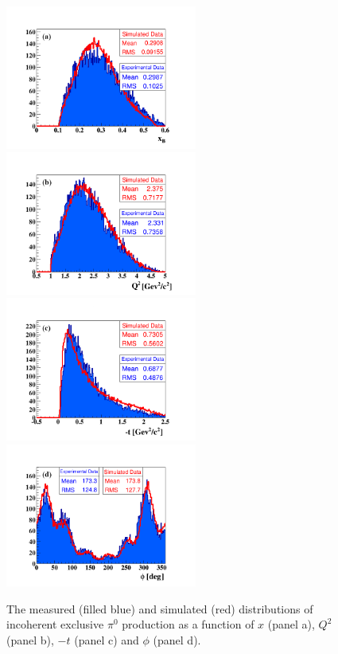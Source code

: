 \documentclass[aps,prc,preprint,superscriptaddress]{revtex4}
\begin{document}
\begin{figure}[p]
\center
\includegraphics[trim=70 15 70 70,clip,width=6.3cm]{xB_InCoh_pi0.png}
\includegraphics[trim=70 15 70 70,clip,width=6.3cm]{Q2_InCoh_pi0.png}
\includegraphics[trim=70 15 70 70,clip,width=6.3cm]{t_InCoh_pi0.png}
\includegraphics[trim=70 15 70 70,clip,width=6.3cm]{phi_h_InCoh_pi0.png}
	\caption{The measured (filled blue) and simulated (red) distributions of
	incoherent exclusive $\pi^0$ production as a function of $x$ (panel a), 
        $Q^2$ (panel b), $-t$ (panel c) and $\phi$ (panel d).}
\label{fig:InCohPi0Simul}
\end{figure}
\end{document}
